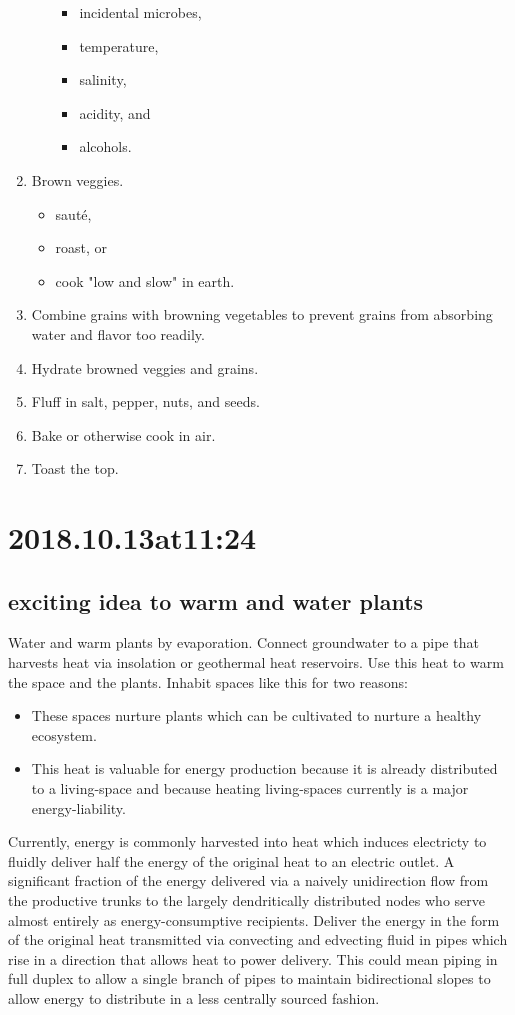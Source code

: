 \begin{enumerate}
\begin{itemize}
\begin{itemize}
        \item incidental microbes,
        \item temperature,
        \item salinity,
        \item acidity, and
        \item alcohols.
      \end{itemize}
    \end{itemize}
  \item Brown veggies.
      \begin{itemize}
        \item saut\'e,
        \item roast, or
        \item cook "low and slow" in earth.
      \end{itemize}
  \item Combine grains with browning vegetables to prevent grains from absorbing water and flavor too readily.
  \item Hydrate browned veggies and grains.
  \item Fluff in salt, pepper, nuts, and seeds.
  \item Bake or otherwise cook in air.
  \item Toast the top.
\end{enumerate} 

\section*{ 2018.10.13at11:24 }
\subsection*{ exciting idea to warm and water plants }
Water and warm plants by evaporation. Connect groundwater to a pipe that harvests heat via insolation or geothermal heat reservoirs. Use this heat to warm the space and the plants. Inhabit spaces like this for two reasons:

\begin{itemize}
\item These spaces nurture plants which can be cultivated to nurture a healthy ecosystem.
\item This heat is valuable for energy production because it is already distributed to a living-space and because heating living-spaces currently is a major energy-liability.
\end{itemize}

Currently, energy is commonly harvested into heat which induces electricty to fluidly deliver half the energy of the original heat to an electric outlet.
A significant fraction of the energy delivered via a naively unidirection flow from the productive trunks to the largely dendritically distributed nodes who serve almost entirely as energy-consumptive recipients.
Deliver the energy in the form of the original heat transmitted via convecting and edvecting fluid in pipes which rise in a direction that allows heat to power delivery.
This could mean piping in full duplex to allow a single branch of pipes to maintain bidirectional slopes to allow energy to distribute in a less centrally sourced fashion.

